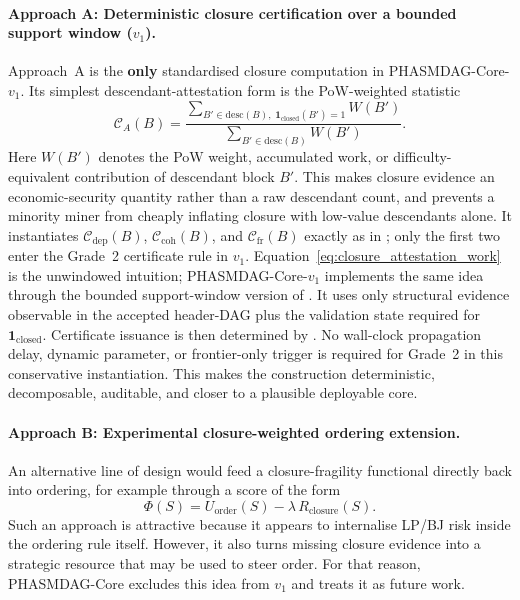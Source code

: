 \documentclass[11pt]{article}
\theoremstyle{definition}
\theoremstyle{plain}
\theoremstyle{remark}
\newcommand{\Clvl}{\mathcal{C}}          %
\newcommand{\Cdep}{\mathcal{C}_{\mathrm{dep}}}
\newcommand{\Ccoh}{\mathcal{C}_{\mathrm{coh}}}
\newcommand{\Cfr}{\mathcal{C}_{\mathrm{fr}}}
\newcommand{\Uord}{U_{\mathrm{order}}}   %
\newcommand{\Rcls}{R_{\mathrm{closure}}} %
\newcommand{\Phifn}{\Phi}               %
\begin{document}
\paragraph{Approach A: Deterministic closure certification over a bounded support window ($v_1$).}
Approach~A is the \textbf{only} standardised closure computation in
PHASMDAG-Core-$v_1$.
Its simplest descendant-attestation form is the PoW-weighted statistic
\begin{equation}\label{eq:closure_attestation_work}
\Clvl_A(B) =
\frac{\sum_{B' \in \mathrm{desc}(B),\;\mathbf{1}_{\mathrm{closed}}(B')=1} W(B')}
{\sum_{B' \in \mathrm{desc}(B)} W(B')}.
\end{equation}
Here $W(B')$ denotes the PoW weight, accumulated work, or
difficulty-equivalent contribution of descendant block $B'$.
This makes closure evidence an economic-security quantity rather than a raw
descendant count, and prevents a minority miner from cheaply inflating
closure with low-value descendants alone.
It instantiates $\Cdep(B)$, $\Ccoh(B)$, and $\Cfr(B)$ exactly as in
; only the first two enter the Grade~2
certificate rule in $v_1$.
Equation~\eqref{eq:closure_attestation_work} is the unwindowed intuition;
PHASMDAG-Core-$v_1$ implements the same idea through the bounded support-window
version of .
It uses only structural evidence observable in the accepted header-DAG plus the
validation state required for $\mathbf{1}_{\mathrm{closed}}$.
Certificate issuance is then determined by .
No wall-clock propagation delay, dynamic parameter, or frontier-only trigger is
required for Grade~2 in this conservative instantiation.
This makes the construction deterministic, decomposable, auditable, and closer
to a plausible deployable core.

\paragraph{Approach B: Experimental closure-weighted ordering extension.}
An alternative line of design would feed a closure-fragility functional
directly back into ordering, for example through a score of the form
\begin{equation}\label{eq:closure_ordering_future}
\Phifn(S) = \Uord(S) - \lambda\,\Rcls(S).
\end{equation}
Such an approach is attractive because it appears to internalise LP/BJ risk
inside the ordering rule itself.
However, it also turns missing closure evidence into a strategic resource that
may be used to steer order.
For that reason, PHASMDAG-Core excludes this idea from $v_1$ and treats it as
future work.
\end{document}
